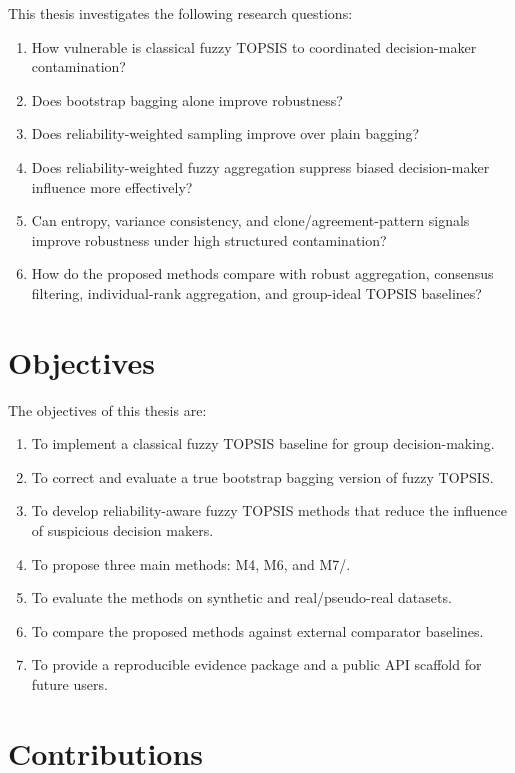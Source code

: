 This thesis investigates the following research questions:

\begin{enumerate}
    \item How vulnerable is classical fuzzy TOPSIS to coordinated decision-maker contamination?
    \item Does bootstrap bagging alone improve robustness?
    \item Does reliability-weighted sampling improve over plain bagging?
    \item Does reliability-weighted fuzzy aggregation suppress biased decision-maker influence more effectively?
    \item Can entropy, variance consistency, and clone/agreement-pattern signals improve robustness under high structured contamination?
    \item How do the proposed methods compare with robust aggregation, consensus filtering, individual-rank aggregation, and group-ideal TOPSIS baselines?
\end{enumerate}

\section{Objectives}

The objectives of this thesis are:

\begin{enumerate}
    \item To implement a classical fuzzy TOPSIS baseline for group decision-making.
    \item To correct and evaluate a true bootstrap bagging version of fuzzy TOPSIS.
    \item To develop reliability-aware fuzzy TOPSIS methods that reduce the influence of suspicious decision makers.
    \item To propose three main methods: M4, M6, and M7/\methodname.
    \item To evaluate the methods on synthetic and real/pseudo-real datasets.
    \item To compare the proposed methods against external comparator baselines.
    \item To provide a reproducible evidence package and a public API scaffold for future users.
\end{enumerate}

\section{Contributions}

